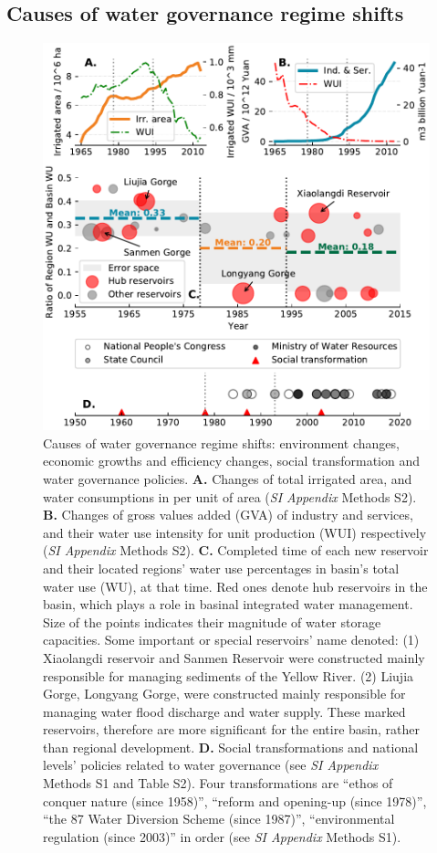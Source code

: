 \documentclass[9pt, twocolumn, twoside, lineno]{pnas-new}
\begin{document}
\subsection*{Causes of water governance regime shifts}
\label{result2}

\begin{figure}[th!]
	\centering
	\includegraphics[width=\linewidth]{../../figures/main/causes.pdf}
	\caption{
		Causes of water governance regime shifts: environment changes, economic growths and efficiency changes, social transformation and water governance policies.
		\textbf{A.} Changes of total irrigated area, and water consumptions in per unit of area (\textit{SI Appendix} Methods S2).
		\textbf{B.} Changes of gross values added (GVA) of industry and services, and their water use intensity for unit production (WUI) respectively (\textit{SI Appendix} Methods S2).
		\textbf{C.} Completed time of each new reservoir and their located regions' water use percentages in basin's total water use (WU), at that time. Red ones denote hub reservoirs in the basin, which plays a role in basinal integrated water management. Size of the points indicates their magnitude of water storage capacities. Some important or special reservoirs' name denoted: (1) Xiaolangdi reservoir and Sanmen Reservoir were constructed mainly responsible for managing sediments of the Yellow River. (2) Liujia Gorge, Longyang Gorge, were constructed mainly responsible for managing water flood discharge and water supply. These marked reservoirs, therefore are more significant for the entire basin, rather than regional development.
		\textbf{D.} Social transformations and national levels' policies related to water governance (see \textit{SI Appendix} Methods S1 and Table S2). Four transformations are ``ethos of conquer nature (since 1958)'', ``reform and opening-up (since 1978)'', ``the 87 Water Diversion Scheme (since 1987)'', ``environmental regulation (since 2003)'' in order (see \textit{SI Appendix} Methods S1).
	}
	\label{fig:Causes}
\end{figure}
\end{document}
